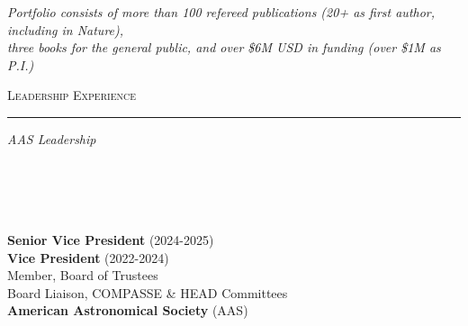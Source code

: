 \documentclass[11pt]{article}
\makeatletter
\def\vhrulefill#1{\leavevmode\leaders\hrule\@height#1\hfill \kern\z@}
\makeatother
\begin{document}



\vspace*{-2mm}

\begin{center}
\textit{Portfolio consists of more than 100 refereed publications (20+ as first author, including in Nature), \\ three books for the general public, and over \$6M USD in funding (over \$1M as P.I.) }  \\
\end{center}




\textsc{Leadership Experience} \vhrulefill{0.4pt}


\vspace{6mm}


\hspace{2.5mm} \parbox{1.5in}{\textit{AAS Leadership}\\\\\\\\\\} \parbox{5.15in}{\textbf{Senior Vice President} (2024-2025)\\\textbf{Vice President} (2022-2024) \\ Member, Board of Trustees \\ Board Liaison, COMPASSE \& HEAD Committees  \\ \textbf{American Astronomical Society} (AAS) \\
}
\end{document}
